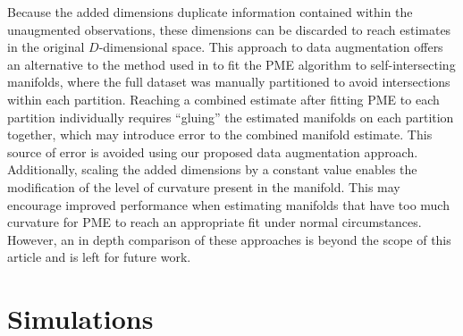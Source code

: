 \documentclass[12pt]{article}
\theoremstyle{definition}
\begin{document}
Because the added dimensions duplicate information contained within the unaugmented observations, these dimensions can be discarded to reach estimates in the original $D$-dimensional space. This approach to data augmentation offers an alternative to the method used in \cite{mengPrincipalManifoldEstimation2021} to fit the PME algorithm to self-intersecting manifolds, where the full dataset was manually partitioned to avoid intersections within each partition. Reaching a combined estimate after fitting PME to each partition individually requires ``gluing'' the estimated manifolds on each partition together, which may introduce error to the combined manifold estimate. This source of error is avoided using our proposed data augmentation approach. Additionally, scaling the added dimensions by a constant value enables the modification of the level of curvature present in the manifold. This may encourage improved performance when estimating manifolds that have too much curvature for PME to reach an appropriate fit under normal circumstances. However, an in depth comparison of these approaches is beyond the scope of this article and is left for future work.





\section{Simulations}\label{s:simulations}
\end{document}
